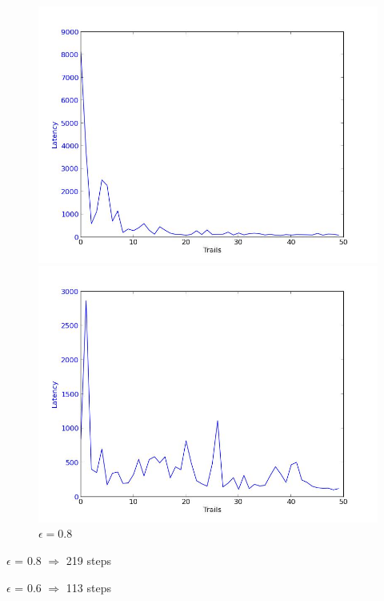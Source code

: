 \documentclass[a4paper, 12pt]{article}
\begin{document}
\begin{figure}
  \centering
  \begin{minipage}[c]{0.5\textwidth}
    \centering
    \includegraphics[scale=0.3]{../figure/eps6.jpeg}
  \caption{$\epsilon = 0.6$}
  \end{minipage}%
  \begin{minipage}[c]{0.5\textwidth}
    \centering
    \includegraphics[scale=0.3]{../figure/eps8.jpeg}
  \caption{$\epsilon = 0.8$}
  \end{minipage}
\end{figure}


$\epsilon$ = 0.8 $\Rightarrow$ 219 steps

$\epsilon$ = 0.6 $\Rightarrow$ 113 steps
\end{document}
